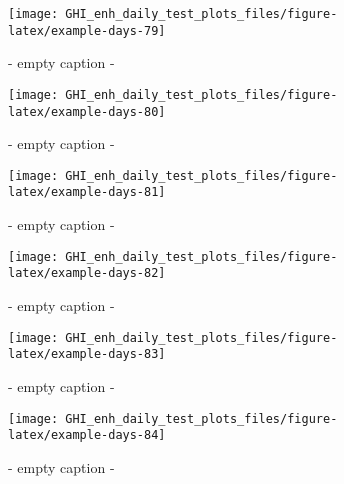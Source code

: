 \documentclass[
  10pt,
  a4paper,oneside]{article}
\begin{document}
\begin{figure}[H]

{\centering \texttt{[image: GHI\_enh\_daily\_test\_plots\_files/figure-latex/example-days-79]} 

}

\caption{ - empty caption - }\label{fig:example-days-79}
\end{figure}

\begin{figure}[H]

{\centering \texttt{[image: GHI\_enh\_daily\_test\_plots\_files/figure-latex/example-days-80]} 

}

\caption{ - empty caption - }\label{fig:example-days-80}
\end{figure}

\begin{figure}[H]

{\centering \texttt{[image: GHI\_enh\_daily\_test\_plots\_files/figure-latex/example-days-81]} 

}

\caption{ - empty caption - }\label{fig:example-days-81}
\end{figure}

\begin{figure}[H]

{\centering \texttt{[image: GHI\_enh\_daily\_test\_plots\_files/figure-latex/example-days-82]} 

}

\caption{ - empty caption - }\label{fig:example-days-82}
\end{figure}

\begin{figure}[H]

{\centering \texttt{[image: GHI\_enh\_daily\_test\_plots\_files/figure-latex/example-days-83]} 

}

\caption{ - empty caption - }\label{fig:example-days-83}
\end{figure}

\begin{figure}[H]

{\centering \texttt{[image: GHI\_enh\_daily\_test\_plots\_files/figure-latex/example-days-84]} 

}

\caption{ - empty caption - }\label{fig:example-days-84}
\end{figure}
\end{document}
